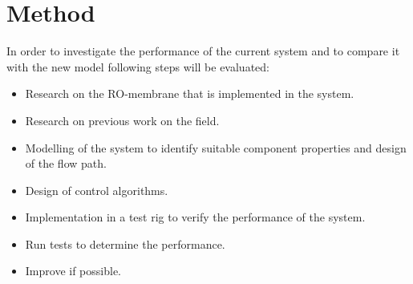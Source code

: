 \section{Method}

In order to investigate the performance of the current system and to compare it with the new model following steps will be evaluated:

\begin{itemize}
\renewcommand\labelitemi{-}
    \item Research on the RO-membrane that is implemented in the system.
    \item Research on previous work on the field.
    \item Modelling of the system to identify suitable component properties and design of the flow path.
    \item Design of control algorithms.
    \item Implementation in a test rig to verify the performance of the system.
    \item Run tests to determine the performance.
    \item Improve if possible.
\end{itemize}




